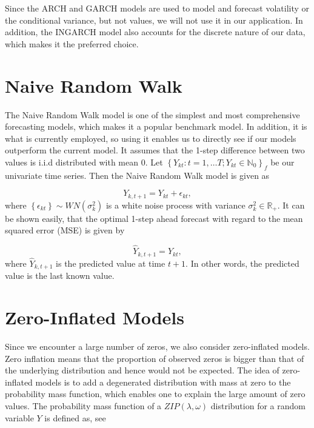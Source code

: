 Since the ARCH and GARCH models are used to model and forecast volatility or the conditional variance, but not values, we will not use it in our application. In addition, the INGARCH model also accounts for the discrete nature of our data, which makes it the preferred choice. 


\section{Naive Random Walk}
\label{sec: Naive Random Walk}

The Naive Random Walk model is one of the simplest and most comprehensive forecasting models, which makes it a popular benchmark model. In addition, it is what is currently employed, so using it enables us to directly see if our models outperform the current model. It assumes that the 1-step difference between two values is i.i.d distributed with mean 0. Let $\left\{Y_{kt}:t=1,\ldots T; Y_{kt} \in \mathbb{N}_0\right\}_f$ be our univariate time series. Then the Naive Random Walk model is given as

\begin{equation}
Y_{k,t+1}= Y_{kt} + \epsilon_{kt}, 
\label{eq: Random Walk Model}
\end{equation}
where $\left\{\epsilon_{kt}\right\} \sim WN(\sigma_k^2)$ is a white noise process with variance $\sigma_k^2 \in \mathbb{R}_+$. It can be shown easily, that the optimal 1-step ahead forecast with regard to the mean squared error (MSE) is given by

\begin{equation}
\hat{Y}_{k,t+1}= Y_{kt},
\label{eq: Random Walk Model Prediction}
\end{equation}
%
where $\hat{Y}_{k,t+1}$ is the predicted value at time $t+1$. In other words, the predicted value is the last known value.  


\section{Zero-Inflated Models}
\label{sec: Zim}

Since we encounter a large number of zeros, we also consider zero-inflated models. Zero inflation means that the proportion of observed zeros is bigger than that of the underlying distribution and hence would not be expected. The idea of zero-inflated models is to add a degenerated distribution with mass at zero to the probability mass function, which enables one to explain the large amount of zero values. The probability mass function of a $ZIP(\lambda,\omega)$ distribution for a random variable $Y$ is defined as, see \textcite{Zhu:2012}

